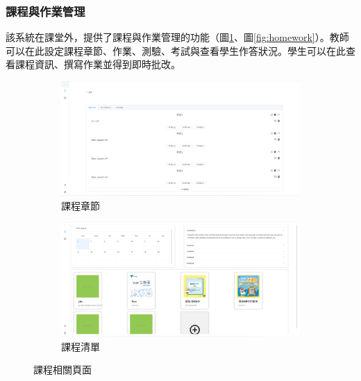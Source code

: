\subsubsection{課程與作業管理}

該系統在課堂外，提供了課程與作業管理的功能（圖\ref{fig:course}、圖\ref{fig:homework}）。教師可以在此設定課程章節、作業、測驗、考試與查看學生作答狀況。學生可以在此查看課程資訊、撰寫作業並得到即時批改。

\begin{figure}[H]
  \begin{subfigure}{0.5\linewidth}
    \centering
    \includegraphics[width=1\textwidth]{images/chapter.png}
    \caption{課程章節}
  \end{subfigure}
  \begin{subfigure}{0.5\linewidth}
    \centering
    \includegraphics[width=1\textwidth]{images/course.png}
    \caption{課程清單}
  \end{subfigure}
  \caption{課程相關頁面}
  \label{fig:course}
\end{figure}

